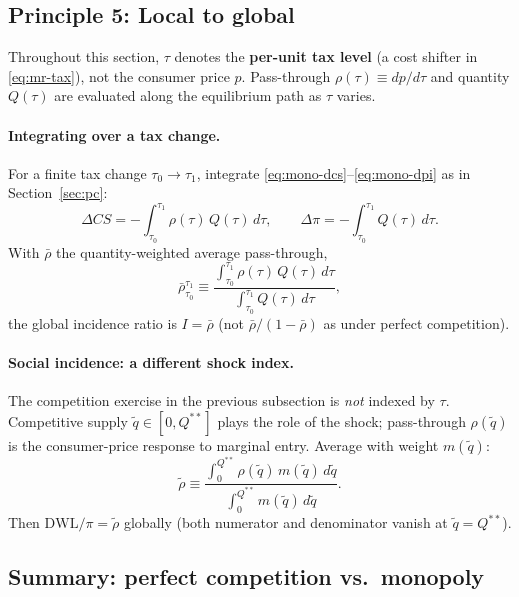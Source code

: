 \documentclass[11pt]{article}
\begin{document}
\subsection{Principle 5: Local to global}

Throughout this section, $\tau$ denotes the \textbf{per-unit tax level} (a
cost shifter in \eqref{eq:mr-tax}), not the consumer price $p$.
Pass-through $\rho(\tau)\equiv dp/d\tau$ and quantity $Q(\tau)$ are evaluated
along the equilibrium path as $\tau$ varies.

\paragraph{Integrating over a tax change.}
For a finite tax change $\tau_0 \to \tau_1$, integrate
\eqref{eq:mono-dcs}--\eqref{eq:mono-dpi} as in Section~\ref{sec:pc}:
\[
  \Delta CS = -\int_{\tau_0}^{\tau_1} \rho(\tau)\,Q(\tau)\,d\tau,
  \qquad
  \Delta\pi = -\int_{\tau_0}^{\tau_1} Q(\tau)\,d\tau.
\]
With $\bar\rho$ the quantity-weighted average pass-through,
\[
  \bar\rho_{\tau_0}^{\tau_1}
  \equiv
  \frac{\int_{\tau_0}^{\tau_1} \rho(\tau)\,Q(\tau)\,d\tau}
       {\int_{\tau_0}^{\tau_1} Q(\tau)\,d\tau},
\]
the global incidence ratio is $I=\bar\rho$ (not $\bar\rho/(1-\bar\rho)$ as
under perfect competition).

\paragraph{Social incidence: a different shock index.}
The competition exercise in the previous subsection is \emph{not} indexed by
$\tau$.  Competitive supply $\tilde q\in[0,Q^{**}]$ plays the role of the
shock; pass-through $\rho(\tilde q)$ is the consumer-price response to
marginal entry.  Average with weight $m(\tilde q)$:
\[
  \tilde\rho \equiv
  \frac{\int_0^{Q^{**}} \rho(\tilde q)\,m(\tilde q)\,d\tilde q}
       {\int_0^{Q^{**}} m(\tilde q)\,d\tilde q}.
\]
Then $\mathrm{DWL}/\pi = \tilde\rho$ globally (both numerator and
denominator vanish at $\tilde q = Q^{**}$).

\subsection{Summary: perfect competition vs.\ monopoly}
\end{document}
